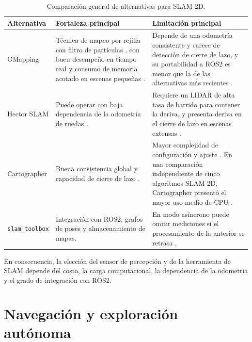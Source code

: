 \begin{table}[htbp]
\centering
\caption{Comparación general de alternativas para SLAM 2D.}
\label{tab:comparativa_slam}
\small
\begin{tabular}{P{2.4cm} P{5.3cm} P{5.9cm}}
\toprule
\textbf{Alternativa} &
\textbf{Fortaleza principal} &
\textbf{Limitación principal} \\
\midrule

GMapping & Técnica de mapeo por rejilla con filtro de partículas
\citep{grisetti2007gmapping}, con buen desempeño en tiempo real y consumo de
memoria acotado en escenas pequeñas \citep{ran2025review2dlidar}.
& Depende de una odometría consistente y carece de detección de cierre de lazo,
y su portabilidad a \gls{ROS2} es menor que la de las alternativas más recientes
\citep{ran2025review2dlidar,ngoc2023efficient,macenski2021slamtoolbox}. \\

Hector SLAM & Puede operar con baja dependencia de la odometría de ruedas
\citep{kohlbrecher2011hector}. & Requiere un \gls{LIDAR} de alta tasa de barrido
para contener la deriva, y presenta deriva en el cierre de lazo en escenas
extensas \citep{ran2025review2dlidar}. \\

Cartographer &
Buena consistencia global y capacidad de cierre de lazo
\citep{hess2016cartographer}. &
Mayor complejidad de configuración y ajuste
\citep{ngoc2023efficient,macenski2023desks}. En una comparación independiente de
cinco algoritmos SLAM 2D, Cartographer presentó el mayor uso medio de CPU
\citep{trejos2022slam}. \\

\texttt{slam\_toolbox} &
Integración con \gls{ROS2}, grafos de poses y almacenamiento de mapas. &
En modo asíncrono puede omitir mediciones si el procesamiento de la anterior se retrasa
\citep{macenski2021slamtoolbox}. \\

\bottomrule
\end{tabular}
\end{table}

En consecuencia, la elección del sensor de percepción y de la herramienta de
SLAM depende del costo, la carga computacional, la dependencia de la odometría
y el grado de integración con \gls{ROS2}.

\section{Navegación y exploración autónoma}
\label{sec:exploracion}

